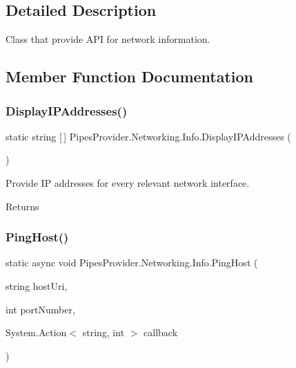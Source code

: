 \subsection{Detailed Description}
Class that provide A\+PI for network information. 



\subsection{Member Function Documentation}
\mbox{\label{class_pipes_provider_1_1_networking_1_1_info_ac8097e6a6bccbeae15e309ce72dbac91}} 
\subsubsection{\texorpdfstring{Display\+I\+P\+Addresses()}{DisplayIPAddresses()}}
{\footnotesize\ttfamily static string \mbox{[}$\,$\mbox{]} Pipes\+Provider.\+Networking.\+Info.\+Display\+I\+P\+Addresses (\begin{DoxyParamCaption}{ }\end{DoxyParamCaption})\hspace{0.3cm}{\ttfamily [static]}}



Provide IP addresses for every relevant network interface. 

\begin{DoxyReturn}{Returns}

\end{DoxyReturn}
\mbox{\label{class_pipes_provider_1_1_networking_1_1_info_aa609196312941e05536dcb3526b9a2ce}} 
\subsubsection{\texorpdfstring{Ping\+Host()}{PingHost()}}
{\footnotesize\ttfamily static async void Pipes\+Provider.\+Networking.\+Info.\+Ping\+Host (\begin{DoxyParamCaption}\item[{string}]{host\+Uri,  }\item[{int}]{port\+Number,  }\item[{System.\+Action$<$ string, int $>$}]{callback }\end{DoxyParamCaption})\hspace{0.3cm}{\ttfamily [static]}}



